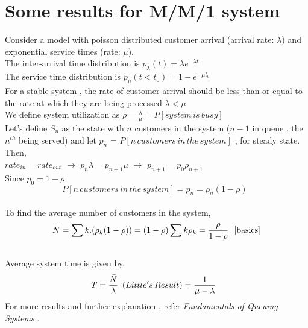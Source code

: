 \section{Some results for M/M/1 system}
Consider a model with poisson distributed customer arrival (arrival rate: $\lambda$) and exponential service times (rate: $\mu$). 
\\ The inter-arrival time distribution is $p_{\lambda}(t)=\lambda e^{-\lambda t}$
\\ The service time distribution is $p_{\mu}(t<t_{0})=1-e^{-\mu t_{0}}$
\\ For a stable system , the rate of customer arrival should be less than or equal to the rate at which they are being processed $\lambda < \mu$ 
\\ We define system utilization as $\rho =\frac{\lambda}{\mu}=P[system\, is \, busy]$ 
\\Let's define $S_{n}$ as the state with $n$ customers in the system ($n-1$ in queue , the $n^{th}$ being served) and let $p_n$ = $P[n\, customers \, in \, the \, system]$ , for steady state. Then,
\\ $rate_{in}=rate_{out}$ $\rightarrow$ $p_n\lambda=p_{n+1}\mu$ $\rightarrow$ $p_{n+1}=p_{0}\rho_{n+1}$ 
\\ Since $p_{0}=1-\rho$
$$P[n\, customers \, in \, the \, system]=p_{n}=\rho_{n}(1-\rho) \ \  $$
\\ To find the average number of customers in the system,
\begin{equation}
    \bar{N}=\sum k.(\rho_{k}(1-\rho))
        = (1-\rho)\sum k\rho_{k} 
        =\frac{\rho}{1-\rho} \ \ \cite{basics}
\end{equation} 
\\ Average system time is given by,
\begin{equation}
    T=\frac{\bar{N}}{\lambda}\,\,\,(Little's\,Result)
    \\=\frac{1}{\mu-\lambda} \ \ 
\end{equation}
For more results and further explanation , refer \textit{Fundamentals of Queuing Systems} \cite{basics}.

